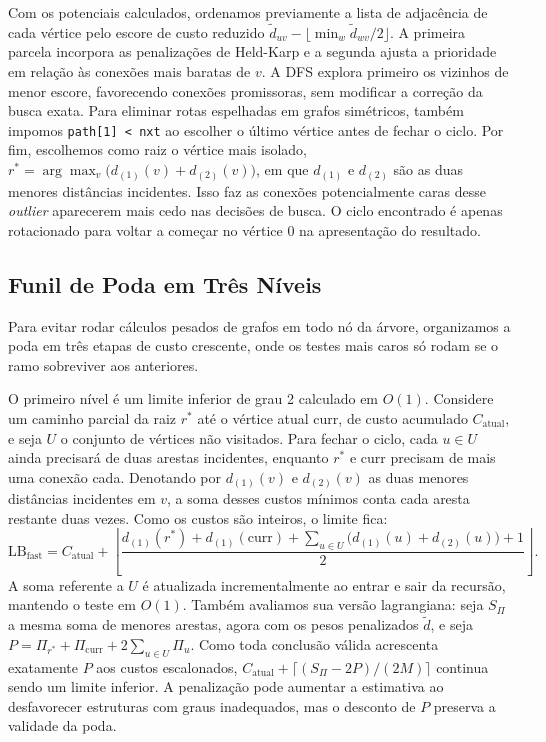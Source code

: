 \documentclass[12pt]{article}
\begin{document}
Com os potenciais calculados, ordenamos previamente a lista de adjacência de cada vértice pelo escore de custo reduzido $\tilde d_{uv}-\lfloor\min_w\tilde d_{wv}/2\rfloor$. A primeira parcela incorpora as penalizações de Held-Karp e a segunda ajusta a prioridade em relação às conexões mais baratas de $v$. A DFS explora primeiro os vizinhos de menor escore, favorecendo conexões promissoras, sem modificar a correção da busca exata. Para eliminar rotas espelhadas em grafos simétricos, também impomos \texttt{path[1] < nxt} ao escolher o último vértice antes de fechar o ciclo. Por fim, escolhemos como raiz o vértice mais isolado, $r^*=\arg\max_v\bigl(d_{(1)}(v)+d_{(2)}(v)\bigr)$, em que $d_{(1)}$ e $d_{(2)}$ são as duas menores distâncias incidentes. Isso faz as conexões potencialmente caras desse \textit{outlier} aparecerem mais cedo nas decisões de busca. O ciclo encontrado é apenas rotacionado para voltar a começar no vértice 0 na apresentação do resultado.

\subsection{Funil de Poda em Três Níveis}

Para evitar rodar cálculos pesados de grafos em todo nó da árvore, organizamos a poda em três etapas de custo crescente, onde os testes mais caros só rodam se o ramo sobreviver aos anteriores.

O primeiro nível é um limite inferior de grau 2 calculado em $O(1)$. Considere um caminho parcial da raiz $r^*$ até o vértice atual $\mathrm{curr}$, de custo acumulado $C_{\mathrm{atual}}$, e seja $U$ o conjunto de vértices não visitados. Para fechar o ciclo, cada $u\in U$ ainda precisará de duas arestas incidentes, enquanto $r^*$ e $\mathrm{curr}$ precisam de mais uma conexão cada. Denotando por $d_{(1)}(v)$ e $d_{(2)}(v)$ as duas menores distâncias incidentes em $v$, a soma desses custos mínimos conta cada aresta restante duas vezes. Como os custos são inteiros, o limite fica:
\begin{equation}
  \mathrm{LB}_{\mathrm{fast}}=C_{\mathrm{atual}}+\left\lfloor\frac{d_{(1)}(r^*)+d_{(1)}(\mathrm{curr})+\sum_{u\in U}\bigl(d_{(1)}(u)+d_{(2)}(u)\bigr)+1}{2}\right\rfloor.
\end{equation}
A soma referente a $U$ é atualizada incrementalmente ao entrar e sair da recursão, mantendo o teste em $O(1)$. Também avaliamos sua versão lagrangiana: seja $S_{\Pi}$ a mesma soma de menores arestas, agora com os pesos penalizados $\tilde d$, e seja $P=\Pi_{r^*}+\Pi_{\mathrm{curr}}+2\sum_{u\in U}\Pi_u$. Como toda conclusão válida acrescenta exatamente $P$ aos custos escalonados, $C_{\mathrm{atual}}+\lceil(S_{\Pi}-2P)/(2M)\rceil$ continua sendo um limite inferior. A penalização pode aumentar a estimativa ao desfavorecer estruturas com graus inadequados, mas o desconto de $P$ preserva a validade da poda.
\end{document}
